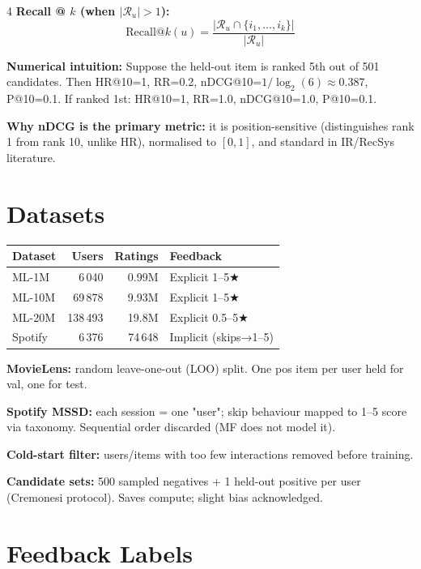 \documentclass[9pt,a4paper,landscape]{article}
\begin{document}
\begin{multicols}{4}
\textbf{Recall @ $k$ (when $|\mathcal{R}_u|>1$):}
\[
\text{Recall@}k(u) = \frac{|\mathcal{R}_u \cap \{i_1,\ldots,i_k\}|}{|\mathcal{R}_u|}
\]

\textbf{Numerical intuition:} Suppose the held-out item is ranked 5th out of 501 candidates. Then HR@10=1, RR=0.2, nDCG@10=$1/\log_2(6)\approx 0.387$, P@10=0.1. If ranked 1st: HR@10=1, RR=1.0, nDCG@10=1.0, P@10=0.1.

\textbf{Why nDCG is the primary metric:} it is position-sensitive (distinguishes rank 1 from rank 10, unlike HR), normalised to $[0,1]$, and standard in IR/RecSys literature.

\section{Datasets}

\begin{tabular}{@{}lrrl@{}}
\toprule
Dataset & Users & Ratings & Feedback\\
\midrule
ML-1M  & 6\,040  & 0.99M & Explicit 1–5★\\
ML-10M & 69\,878 & 9.93M & Explicit 1–5★\\
ML-20M & 138\,493& 19.8M & Explicit 0.5–5★\\
Spotify & 6\,376 & 74\,648& Implicit (skips→1–5)\\
\bottomrule
\end{tabular}

\vspace{3pt}
\textbf{MovieLens:} random leave-one-out (LOO) split. One pos item per user held for val, one for test.

\textbf{Spotify MSSD:} each session = one "user"; skip behaviour mapped to 1–5 score via taxonomy. Sequential order discarded (MF does not model it).

\textbf{Cold-start filter:} users/items with too few interactions removed before training.

\textbf{Candidate sets:} 500 sampled negatives + 1 held-out positive per user (Cremonesi protocol). Saves compute; slight bias acknowledged.

\section{Feedback Labels}


\end{multicols}
\end{document}
